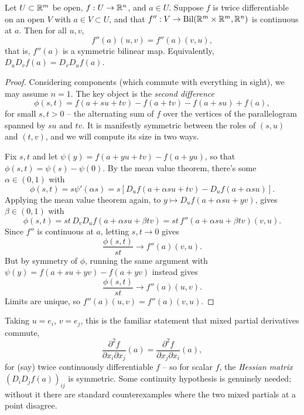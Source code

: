 \documentclass[a4paper]{scrartcl}
\begin{document}
\begin{theorem}
    Let $U \subset \mathbb{R}^m$ be open, $f: U \rightarrow \mathbb{R}^n$, and $a \in U$. Suppose $f$ is twice differentiable on an open $V$ with $a \in V \subset U$, and that $f'': V \rightarrow \operatorname{Bil}(\mathbb{R}^m \times \mathbb{R}^m, \mathbb{R}^n)$ is continuous at $a$. Then for all $u, v$,
    $$
    f''(a)(u, v) = f''(a)(v, u),
    $$
    that is, $f''(a)$ is a symmetric bilinear map. Equivalently, $D_uD_vf(a) = D_vD_uf(a)$.
\end{theorem}
\begin{proof}
    Considering components (which commute with everything in sight), we may assume $n = 1$. The key object is the \emph{second difference}
    $$
    \phi(s, t) = f(a + su + tv) - f(a + tv) - f(a + su) + f(a),
    $$
    for small $s, t > 0$ -- the alternating sum of $f$ over the vertices of the parallelogram spanned by $su$ and $tv$. It is manifestly symmetric between the roles of $(s, u)$ and $(t, v)$, and we will compute its size in two ways.

    Fix $s, t$ and let $\psi(y) = f(a + yu + tv) - f(a + yu)$, so that $\phi(s, t) = \psi(s) - \psi(0)$. By the mean value theorem, there's some $\alpha \in (0, 1)$ with
    $$
    \phi(s, t) = s\psi'(\alpha s) = s\left[D_uf(a + \alpha su + tv) - D_uf(a + \alpha su)\right].
    $$
    Applying the mean value theorem again, to $y \mapsto D_uf(a + \alpha su + yv)$, gives $\beta \in (0, 1)$ with
    $$
    \phi(s, t) = st\, D_vD_uf(a + \alpha su + \beta tv) = st\,f''(a + \alpha su + \beta tv)(v, u).
    $$
    Since $f''$ is continuous at $a$, letting $s, t \rightarrow 0$ gives
    $$
    \frac{\phi(s, t)}{st} \rightarrow f''(a)(v, u).
    $$
    But by symmetry of $\phi$, running the same argument with $\psi(y) = f(a + su + yv) - f(a + yv)$ instead gives
    $$
    \frac{\phi(s, t)}{st} \rightarrow f''(a)(u, v).
    $$
    Limits are unique, so $f''(a)(u, v) = f''(a)(v, u)$.
\end{proof}

\begin{remark}
    Taking $u = e_i$, $v = e_j$, this is the familiar statement that mixed partial derivatives commute,
    $$
    \frac{\partial^2 f}{\partial x_i \partial x_j}(a) = \frac{\partial^2 f}{\partial x_j \partial x_i}(a),
    $$
    for (say) twice continuously differentiable $f$ -- so for scalar $f$, the \emph{Hessian matrix} $(D_iD_jf(a))_{ij}$ is symmetric. Some continuity hypothesis is genuinely needed; without it there are standard counterexamples where the two mixed partials at a point disagree.
\end{remark}
\end{document}
